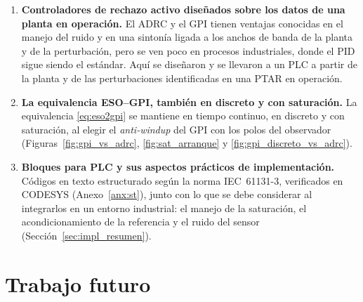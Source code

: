 \begin{enumerate}

  \item \textbf{Controladores de rechazo activo diseñados sobre los datos de una planta en operación.}
  El ADRC y el GPI tienen ventajas conocidas en el manejo del ruido y en una sintonía ligada a los anchos
  de banda de la planta y de la perturbación, pero se ven poco en procesos industriales, donde el PID
  sigue siendo el estándar. Aquí se diseñaron y se llevaron a un PLC a partir de la planta y de las
  perturbaciones identificadas en una PTAR en operación.

  \item \textbf{La equivalencia ESO--GPI, también en discreto y con saturación.} La equivalencia
  \eqref{eq:eso2gpi} se mantiene en tiempo continuo, en discreto y con saturación, al elegir el
  \emph{anti-windup} del GPI con los polos del observador (Figuras~\ref{fig:gpi_vs_adrc},
  \ref{fig:sat_arranque} y \ref{fig:gpi_discreto_vs_adrc}).

  \item \textbf{Bloques para PLC y sus aspectos prácticos de implementación.} Códigos en texto
  estructurado según la norma IEC~61131-3, verificados en CODESYS (Anexo~\ref{anx:st}), junto con lo que
  se debe considerar al integrarlos en un entorno industrial: el manejo de la saturación, el
  acondicionamiento de la referencia y el ruido del sensor (Sección~\ref{sec:impl_resumen}).

\end{enumerate}

\section{Trabajo futuro}

